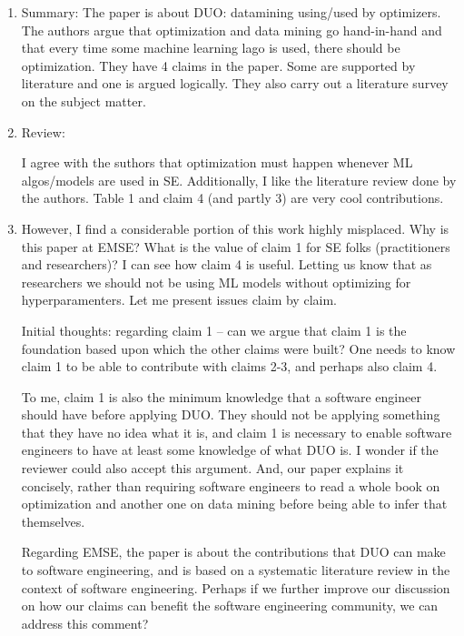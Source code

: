 \documentclass{article}
\newenvironment{com}{\color{blue}\begin{itshape}}{\end{itshape}\vspace{1ex}}
\begin{document}
\begin{enumerate}

\item \begin{com}Summary: The paper is about DUO: datamining using/used by optimizers. The authors argue that optimization and data mining go hand-in-hand and that every time some machine learning lago is used, there should be optimization. They have 4 claims in the paper. Some are supported by literature and one is argued logically. They also carry out a literature survey on the subject matter.
\end{com}

\item \begin{com}
Review:

I agree with the suthors that optimization must happen whenever ML algos/models are used in SE. Additionally, I like the literature review done by the authors. Table 1 and claim 4 (and partly 3) are very cool contributions.
\end{com}

\item \begin{com}

However, I find a considerable portion of this work highly misplaced. Why is this paper at EMSE? What is the value of claim 1 for SE folks (practitioners and researchers)? I can see how claim 4 is useful. Letting us know that as researchers we should not be using ML models without optimizing for hyperparamenters. Let me present issues claim by claim.
\end{com}

Initial thoughts: regarding claim 1 -- can we argue that claim 1 is the foundation based upon which the other claims were built? One needs to know claim 1 to be able to contribute with claims 2-3, and perhaps also claim 4. 

To me, claim 1 is also the minimum knowledge that a software engineer should have before applying DUO. They should not be applying something that they have no idea what it is, and claim 1 is necessary to enable software engineers to have at least some knowledge of what DUO is. I wonder if the reviewer could also accept this argument. And, our paper explains it concisely, rather than requiring software engineers to read a whole book on optimization and another one on data mining before being able to infer that themselves.

Regarding EMSE, the paper is about the contributions that DUO can make to software engineering, and is based on a systematic literature review in the context of software engineering. Perhaps if we further improve our discussion on how our claims can benefit the software engineering community, we can address this comment?


\end{enumerate}
\end{document}

